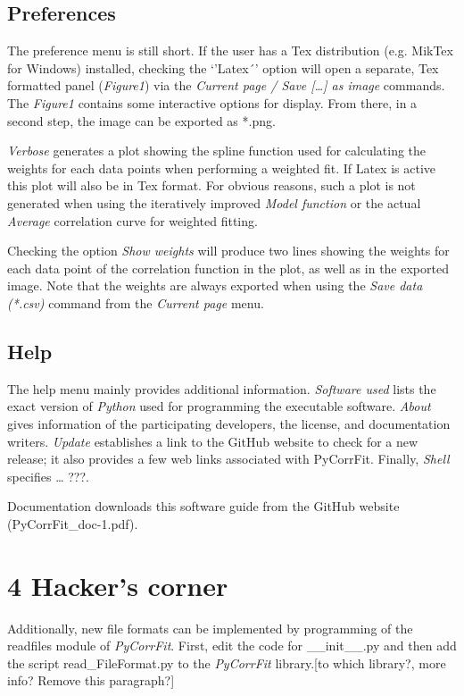 \subsection{Preferences}

The preference menu is still short. If the user has a Tex distribution (e.g. MikTex for Windows) installed, checking the `'Latex´' option will open a separate, Tex formatted panel (\textit{Figure1}) via the \textit{Current page / Save […] as image} commands. The \textit{Figure1} contains some interactive options for display. From there, in a second step, the image can be exported as *.png.

\textit{Verbose} generates a plot showing the spline function used for calculating the weights for each data points when performing a weighted fit. If Latex is active this plot will also be in Tex format. For obvious reasons, such a plot is not generated when using the iteratively improved \textit{Model function} or the actual \textit{Average} correlation curve for weighted fitting.

Checking the option \textit{Show weights} will produce two lines showing the weights for each data point of the correlation function in the plot, as well as in the exported image. Note that the weights are always exported when using the \textit{Save data (*.csv)} command from the \textit{Current page} menu.

\subsection{Help}

The help menu mainly provides additional information. \textit{Software used} lists the exact version of \textit{Python} used for programming the executable software. \textit{About} gives information of the participating developers, the license, and documentation writers. \textit{Update} establishes a link to the GitHub website to check for a new release; it also provides a few web links associated with PyCorrFit. Finally, \textit{Shell} specifies … ???.

Documentation downloads this software guide from the GitHub website (PyCorrFit\_doc-1.pdf).

\section{4 Hacker's corner}

Additionally, new file formats can be implemented by programming of the readfiles module of \textit{PyCorrFit}. First, edit the code for \_\_init\_\_.py and then add the script read\_FileFormat.py to the \textit{PyCorrFit} library.[to which library?, more info? Remove this paragraph?] 

